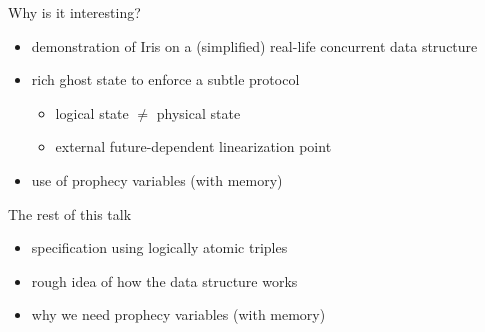 \begin{frame}{Why is it interesting?}
\begin{itemize}
	\item demonstration of Iris on a (simplified) real-life concurrent data structure
	\item rich ghost state to enforce a subtle protocol
		\begin{itemize}
			\item logical state $\neq$ physical state
			\item external future-dependent linearization point
		\end{itemize}
	\item use of prophecy variables (with memory)
\end{itemize}
\end{frame}

\begin{frame}{The rest of this talk}
\begin{itemize}
	\item specification using logically atomic triples
	\item rough idea of how the data structure works
	\item why we need prophecy variables (with memory)
\end{itemize}
\end{frame}
